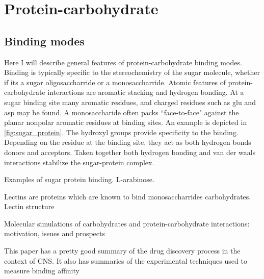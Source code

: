 \section{Protein-carbohydrate}

\subsection{Binding modes}
Here I will describe general features of protein-carbohydrate binding modes. Binding is typically specific to the stereochemistry of the sugar molecule, whether if its a sugar oligosaccharride or a monosaccharride. Atomic features of protein-carbohydrate interactions are aromatic stacking and hydrogen bonding.\cite{Vyas:1991p6498}  At a sugar binding site many aromatic residues, and charged residues such as glu and asp may be found. A monosaccharide often packs ``face-to-face" against the planar nonpolar aromatic residues at binding sites.  An example is depicted in \ref{fig:sugar_protein}.  The hydroxyl groups provide specificity to the binding.  Depending on the residue at the binding site, they act as both hydrogen bonds donors and acceptors. Taken together both hydrogen bonding and van der waals interactions stabilize the sugar-protein complex.

Examples of sugar protein binding.  L-arabinose. %

Lectins are proteins which are known to bind monosaccharrides carbohydrates. Lectin structure\cite{Rini:1995p2497}

Molecular simulations of carbohydrates and protein-carbohydrate interactions: motivation, issues and prospects\cite{Fadda:2010p5889}

This paper has a pretty good summary of the drug discovery process in the context of CNS. It also has summaries of the experimental techniques used to measure binding affinity\cite{Hubbard:2011fs}

